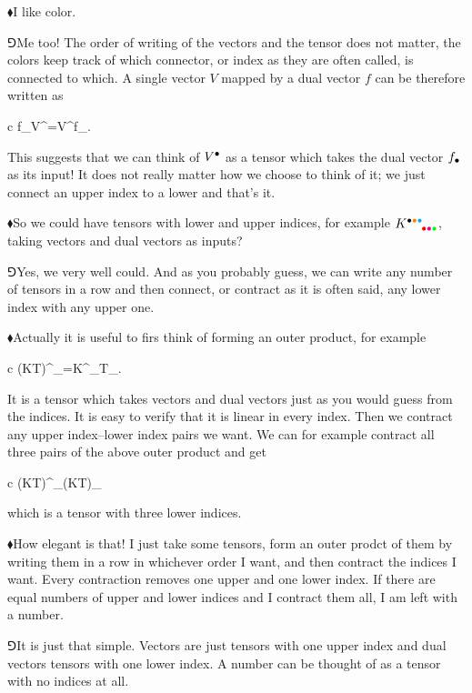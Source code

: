 \documentclass[10pt,oneside%
]{memoir}
\newenvironment{eqna}{\begin{IEEEeqnarray*}{c}}{\end{IEEEeqnarray*}\ignorespacesafterend}
\newcommand{\tensa}[2]{#1_{#2}}
\newcommand{\tensya}[3]{#1^{#2}_{\phantom{#2}#3}}
\newcommand{\coa}{{\color{black}\bullet}}
\newcommand{\cob}{{\color{oranssi}\bullet}}
\newcommand{\coc}{{\color{cyan}\bullet}}
\newcommand{\cod}{{\color{red}\bullet}}
\newcommand{\coe}{{\color{magenta}\bullet}}
\newcommand{\cof}{{\color{green}\bullet}}
\newcommand{\cog}{{\color{safi}\bullet}}
\newcommand{\coh}{{\color{yellow}\bullet}}
\newcommand{\coi}{{\color{blue}\bullet}}
\newcommand{\hea}{\(\blacklozenge\)\;}
\newcommand{\heb}{\(\Game\)\;}
\begin{document}
\hea I like color.

\heb Me too! The order of writing of the vectors and the tensor does not matter, the colors keep track of which connector, or index as they are often called, is connected to which. A single vector \(V\) mapped by a dual vector \(f\) can be therefore written as
\begin{eqna}
    f_\coa V^\coa=V^\coa f_\coa.
\end{eqna}
This suggests that we can think of \(V^\coa\) as a tensor which takes the dual vector \(f_\coa\) as its input! It does not really matter how we choose to think of it; we just connect an upper index to a lower and that's it.

\hea So we could have tensors with lower and upper indices, for example \(\tensya{K}{\coa\cob\coc}{\cod\coe\cof}\), taking vectors and dual vectors as inputs?

\heb Yes, we very well could. And as you probably guess, we can write any number of tensors in a row and then connect, or contract as it is often said, any lower index with any upper one.

\hea Actually it is useful to firs think of forming an outer product, for example
\begin{eqna}
    \tensya{(KT)}{\coa\cob\coc}{\cod\coe\cof\cog\coh\coi}=\tensya{K}{\coa\cob\coc}{\cod\coe\cof}\tensa{T}{\cog\coh\coi}.
\end{eqna}
It is a tensor which takes vectors and dual vectors just as you would guess from the indices. It is easy to verify that it is linear in every index. Then we contract any upper index--lower index pairs we want. We can for example contract all three pairs of the above outer product and get
\begin{eqna}
    \tensya{(KT)}{\coa\cob\coc}{\cod\coe\cof\coa\cob\coc}\doteq\tensa{(KT)}{\cod\coe\cof}
\end{eqna}
which is a tensor with three lower indices.

\hea How elegant is that! I just take some tensors, form an outer prodct of them by writing them in a row in whichever order I want, and then contract the indices I want. Every contraction removes one upper and one lower index. If there are equal numbers of upper and lower indices and I contract them all, I am left with a number.

\heb It is just that simple. Vectors are just tensors with one upper index and dual vectors tensors with one lower index. A number can be thought of as a tensor with no indices at all.
\end{document}

